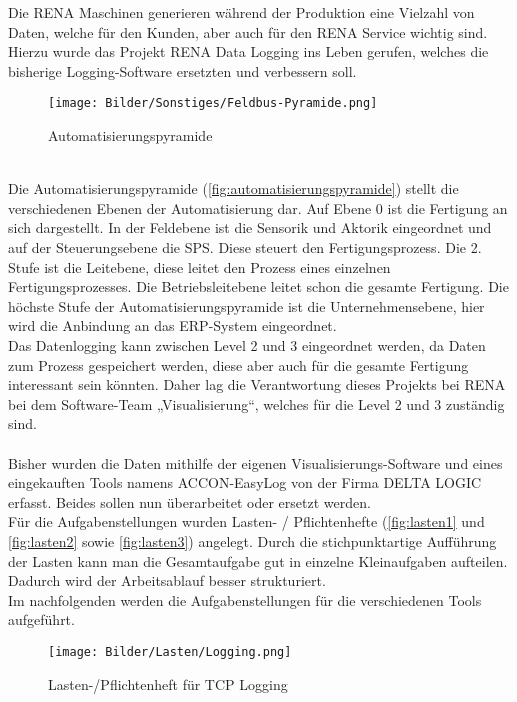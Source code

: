 Die RENA Maschinen generieren während der Produktion eine Vielzahl von Daten, welche für den Kunden, aber auch für den RENA Service wichtig sind. Hierzu wurde das Projekt \glqq RENA Data Logging\grqq{} ins Leben gerufen, welches die bisherige Logging-Software ersetzten und verbessern soll.
\ \\
\begin{figure}
\centering
 \texttt{[image: Bilder/Sonstiges/Feldbus-Pyramide.png]}
 \caption[Automatisierungspyramide]{Automatisierungspyramide \cite{automatisierungspyramide}}
 \label{fig:automatisierungspyramide}
\end{figure}
\ \\
Die Automatisierungspyramide (\autoref{fig:automatisierungspyramide}) stellt die verschiedenen Ebenen der Automatisierung dar. Auf Ebene 0 ist die Fertigung an sich dargestellt. In der Feldebene ist die Sensorik und Aktorik eingeordnet und auf der Steuerungsebene die SPS. Diese steuert den Fertigungsprozess. Die 2. Stufe ist die Leitebene, diese leitet den Prozess eines einzelnen Fertigungsprozesses. Die Betriebsleitebene leitet schon die gesamte Fertigung. Die höchste Stufe der Automatisierungspyramide ist die Unternehmensebene, hier wird die Anbindung an das ERP-System  eingeordnet. 
\ \\
Das Datenlogging kann zwischen Level 2 und 3 eingeordnet werden, da Daten zum Prozess gespeichert werden, diese aber auch für die gesamte Fertigung interessant sein könnten. Daher lag die Verantwortung dieses Projekts bei RENA bei dem Software-Team „Visualisierung“, welches für die Level 2 und 3 zuständig sind.
\ \\
\ \\
Bisher wurden die Daten mithilfe der eigenen Visualisierungs-Software und eines eingekauften Tools namens \glqq ACCON-EasyLog\grqq{}  von der Firma DELTA LOGIC \cite{deltalogic} erfasst. Beides sollen nun überarbeitet oder ersetzt werden.
\ \\
Für die Aufgabenstellungen wurden Lasten- / Pflichtenhefte (\autoref{fig:lasten1} und \autoref{fig:lasten2} sowie \autoref{fig:lasten3}) angelegt. Durch die stichpunktartige Aufführung der Lasten kann man die Gesamtaufgabe gut in einzelne Kleinaufgaben aufteilen. Dadurch wird der Arbeitsablauf besser strukturiert. 
\ \\
Im nachfolgenden werden die Aufgabenstellungen für die verschiedenen Tools aufgeführt.
\begin{figure}
\centering
 \texttt{[image: Bilder/Lasten/Logging.png]}
 \caption[Lasten-/Pflichtenheft für \glqq TCP Logging\grqq{}]{Lasten-/Pflichtenheft für \glqq TCP Logging\grqq{}}
 \label{fig:lasten1}
\end{figure}
